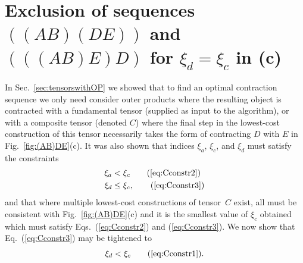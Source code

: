 \documentclass[aps,pre,reprint,superscriptaddress,amsfonts,amsmath,showpacs,nofootinbib,floatfix]{revtex4-1}
\newcommand{\Eref}[1]{Eq.~(\ref{#1})}
\newcommand{\Erefs}[2]{Eqs.~(\ref{#1}) and (\ref{#2})}
\newcommand{\fref}[1]{Fig.~\ref{#1}}
\newcommand{\sref}[1]{Sec.~\ref{#1}}
\newcommand{\pfref}[1]{\protect{Fig.~\ref{#1}}}
\newcommand{\xa}{\xi_a}
\newcommand{\xc}{\xi_c}
\newcommand{\xd}{\xi_d}
\begin{document}
\section{Exclusion of sequences $((AB)(DE))$ and $(((AB)E)D)$ for $\xd=\xc$ in \pfref{fig:(AB)DE}(c)\label{sec:tensorswithOP_noAB}}

In \sref{sec:tensorswithOP} we showed that to find an optimal contraction sequence we only need consider outer products where the resulting object is contracted with a fundamental tensor (supplied as input to the algorithm), or with a composite tensor (denoted $C$) where the final step in the lowest-cost construction of this tensor necessarily takes the form of contracting $D$ with $E$ in \fref{fig:(AB)DE}(c). It was also shown that indices $\xa$, $\xc$, and $\xd$ must satisfy the constraints
\begin{align}
\xa&<\xc\tag{\ref{eq:Cconstr2}}\\
\xd&\leq\xc,\tag{\ref{eq:Cconstr3}}
\end{align}
and that where multiple lowest-cost constructions of tensor~$C$ exist, all must be consistent with \fref{fig:(AB)DE}(c) and it is the smallest value of $\xc$ obtained which must satisfy \Erefs{eq:Cconstr2}{eq:Cconstr3}. We now show that \Eref{eq:Cconstr3} may be tightened to
\begin{equation}
\xd<\xc\tag{\ref{eq:Cconstr1}}.
\end{equation}
\end{document}
